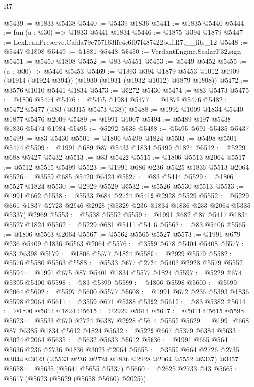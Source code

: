 \begin{lexlean}{R7}
\begin{coremodule}
@5439 := @1833 @5438
@5440 := @5439 @1836
@5441 := @1835 @5440
@5444 := fun (a : @30) => @1833 @5441 @1834
@5446 := @1875 @394 @1879
@5447 := LexLeanPreserve.Cafda79c757163ffe4c6f07f487422bdf.R7.__fits_12
@5448 := @5447 @1808
@5449 := @1881 @5448
@5450 := VerdantEngine.ScalarF32.sign
@5451 := @5450 @1808
@5452 := @83 @5451
@5453 := @5449 @5452
@5455 := (a : @30) -> @5446 @5453
@5469 := @1893
    @394
    @1879
    @5453
    @1012
    @1909
    (@1914 (@1924 @394))
    (@1930 (@1931 (@1932 @1012) @1879 @1908))
@5472 := @3576 @1010 @5441 @1834
@5473 := @5272 @5430
@5474 := @83 @5473
@5475 := @1806 @5474
@5476 := @5475 @1984
@5477 := @1878 @5476
@5482 := @5472 @5477 (@83 (@3315 @5473 @38))
@5488 := @1992 @1009 @1834 @5440 @1877 @5476 @2009
@5489 := @1991 @1007
@5494 := @5489 @197 @5438 @1836 @5474 @1984
@5495 := @5292 @538
@5498 := @5495 @691 @5435 @5437
@5499 := @83 @5430
@5501 := @1806 @5499 @1824
@5503 := @5498 @5501 @5474
@5509 := @1991 @689 @87 @5433 @1834 @5499 @1824
@5512 := @5229 @688 @5427 @5432
@5513 := @83 @5422
@5515 := @1806 @5513 @2064
@5517 := @5512 @5515 @5499
@5523 := @1991 @686 @236 @5425 @1836 @5513 @2064
@5526 := @3559 @685 @5420 @5424
@5527 := @83 @5414
@5529 := @1806 @5527 @1824
@5530 := @2929 @5529
@5532 := @5526 @5530 @5513
@5533 := @1991 @662
@5538 := @5533 @684 @2724 @5419 @2928 @5529
@5552 := @5229 @661 @1837 @2723 @2946 @2928 (@5329 @236 @1834 @1836 @233 @2064 @5335 @5337) @2969
@5553 := @5538 @5552
@5559 := @1991 @682 @87 @5417 @1834 @5527 @1824
@5562 := @5229 @681 @5411 @5416
@5563 := @83 @5406
@5565 := @1806 @5563 @2064
@5567 := @5562 @5565 @5527
@5573 := @1991 @679 @236 @5409 @1836 @5563 @2064
@5576 := @3559 @678 @5404 @5408
@5577 := @83 @5398
@5579 := @1806 @5577 @1824
@5580 := @2929 @5579
@5582 := @5576 @5580 @5563
@5588 := @5533 @677 @2724 @5403 @2928 @5579 @5552
@5594 := @1991 @675 @87 @5401 @1834 @5577 @1824
@5597 := @5229 @674 @5395 @5400
@5598 := @83 @5390
@5599 := @1806 @5598
@5600 := @5599 @2064
@5602 := @5597 @5600 @5577
@5608 := @1991 @672 @236 @5393 @1836 @5598 @2064
@5611 := @3559 @671 @5388 @5392
@5612 := @83 @5382
@5614 := @1806 @5612 @1824
@5615 := @2929 @5614
@5617 := @5611 @5615 @5598
@5623 := @5533 @670 @2724 @5387 @2928 @5614 @5552
@5629 := @1991 @668 @87 @5385 @1834 @5612 @1824
@5632 := @5229 @667 @5379 @5384
@5633 := @3024 @2064
@5635 := @5632 @5633 @5612
@5636 := @1991 @665
@5641 := @5636 @236 @2736 @1836 @3023 @2064
@5655 := @3559 @664 @2726 @2735 @3044 @3023 (@5533 @236 @2724 @1836 @2928 @2064 @5552 @5337) @3057
@5658 := @5635 (@5641 @5655 @5337)
@5660 := @2625 @2733 @43
@5665 := @5617 (@5623 (@5629 (@5658 @5660) @2025))

\end{coremodule}
\end{lexlean}
